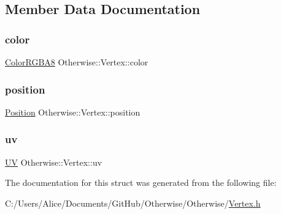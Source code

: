 \subsection{Member Data Documentation}
\mbox{\label{struct_otherwise_1_1_vertex_a6af8f407d213eb5885c345b47de277d8}} 
\subsubsection{\texorpdfstring{color}{color}}
{\footnotesize\ttfamily \hyperlink{struct_otherwise_1_1_color_r_g_b_a8}{Color\+R\+G\+B\+A8} Otherwise\+::\+Vertex\+::color}

\mbox{\label{struct_otherwise_1_1_vertex_a95a1a79fa4ef68e871b6bd5f978d978b}} 
\subsubsection{\texorpdfstring{position}{position}}
{\footnotesize\ttfamily \hyperlink{struct_otherwise_1_1_position}{Position} Otherwise\+::\+Vertex\+::position}

\mbox{\label{struct_otherwise_1_1_vertex_aa8d988fd971a54434b5952b3a2b44c5a}} 
\subsubsection{\texorpdfstring{uv}{uv}}
{\footnotesize\ttfamily \hyperlink{struct_otherwise_1_1_u_v}{UV} Otherwise\+::\+Vertex\+::uv}



The documentation for this struct was generated from the following file\+:\begin{DoxyCompactItemize}
\item 
C\+:/\+Users/\+Alice/\+Documents/\+Git\+Hub/\+Otherwise/\+Otherwise/\hyperlink{_vertex_8h}{Vertex.\+h}\end{DoxyCompactItemize}
